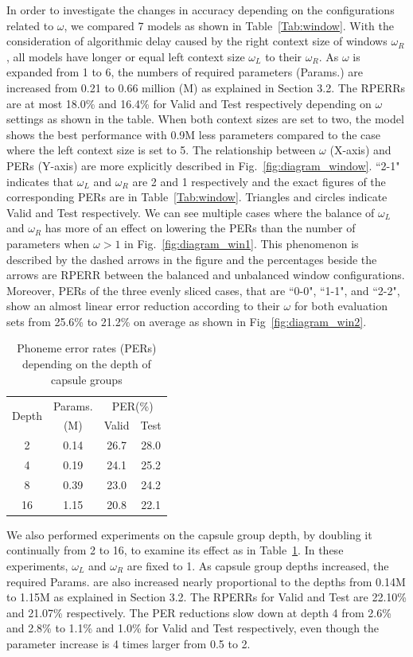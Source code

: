 \documentclass[review]{elsarticle}
\begin{document}
In order to investigate the changes in accuracy depending on the configurations related to $\omega$, we compared 7 models as shown in Table~\ref{Tab:window}.
With the consideration of algorithmic delay caused by the right context size of windows $\omega_R$, all models have longer or equal left context size $\omega_L$ to their $\omega_R$.
As $\omega$ is expanded from 1 to 6, the numbers of required parameters (Params.) are increased from 0.21 to 0.66 million (M) as explained in  Section 3.2.
The RPERRs are at most 18.0\% and 16.4\% for Valid and Test respectively depending on $\omega$ settings as shown in the table.
When both context sizes are set to two, the model shows the best performance with 0.9M less parameters compared to the case where the left context size is set to 5.
The relationship between $\omega$ (X-axis) and PERs (Y-axis) are more explicitly described in Fig.~\ref{fig:diagram_window}.
``2-1" indicates that $\omega_L$ and $\omega_R$ are 2 and 1 respectively and the exact figures of the corresponding PERs are in Table~\ref{Tab:window}.
Triangles and circles indicate Valid and Test respectively.
We can see multiple cases where the balance of $\omega_L$ and $\omega_R$ has more of an effect on lowering the PERs than the number of parameters when $\omega > 1$ in Fig.~\ref{fig:diagram_win1}.
This phenomenon is described by the dashed arrows in the figure and the percentages beside the arrows are RPERR between the balanced and unbalanced window configurations.
Moreover, PERs of the three evenly sliced cases, that are ``0-0", ``1-1", and ``2-2", show an almost linear error reduction according to their $\omega$ for both evaluation sets from 25.6\% to 21.2\% on average as shown in Fig~\ref{fig:diagram_win2}.

\begin{table}[]
\centering
\begin{tabular}{cccc}
\multirow{2}{*}{Depth} & Params. & \multicolumn{2}{c}{PER(\%)} \\ 
                       & (M)     & Valid & Test \\\hline
2 & 0.14 & 26.7 & 28.0 \\
4 & 0.19 & 24.1 & 25.2 \\
8 & 0.39 & 23.0 & 24.2 \\
16 & 1.15 & 20.8 & 22.1
\end{tabular}
\caption{Phoneme error rates (PERs) depending on the depth of capsule groups}%
\label{Tab:depth}
\end{table}

We also performed experiments on the capsule group depth, by doubling it continually from 2 to 16, to examine its effect as in Table~\ref{Tab:depth}.
In these experiments, $\omega_L$ and $\omega_R$ are fixed to 1.
As capsule group depths increased, the required Params. are also increased nearly proportional to the depths from 0.14M to 1.15M as explained in Section 3.2.
The RPERRs for Valid and Test are 22.10\% and 21.07\% respectively.
The PER reductions slow down at depth 4 from 2.6\% and 2.8\% to 1.1\% and 1.0\% for Valid and Test respectively, even though the parameter increase is 4 times larger from 0.5 to 2.
\end{document}
